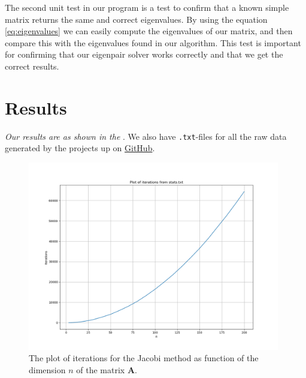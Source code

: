 \documentclass{article}
\begin{document}
The second unit test in our program is a test to confirm that a known simple matrix returns the same and correct eigenvalues. By using the equation \ref{eq:eigenvalues} we can easily compute the eigenvalues of our matrix, and then compare this with the eigenvalues found in our algorithm. This test is important for confirming that our eigenpair solver works correctly and that we get the correct results. \\


\vspace{1cm}

\section{Results} \label{sec:Results}

  \textit{Our results are as shown in the }. We also have \texttt{.txt}-files for all the raw data generated by the projects up on \href{https://github.com/Erikbgram/Fys3150}{GitHub}. \\


  \begin{figure}[ht]
  	\centering
    \includegraphics[width = 11cm]{iterations-stats.png}
  	\caption{The plot of iterations for the Jacobi method as function of the dimension $n$ of the matrix \textbf{A}. }
    \label{fig:iterationspng}
  \end{figure}
\end{document}
